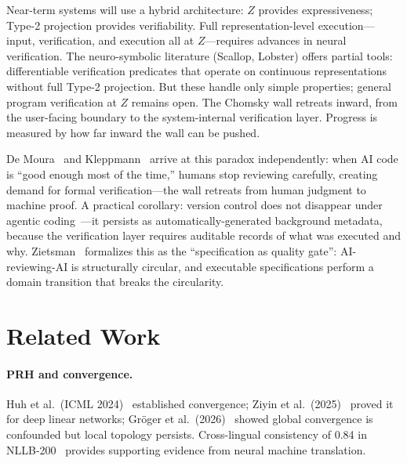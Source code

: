 \documentclass[11pt]{article}
\theoremstyle{definition}
\begin{document}
Near-term systems will use a hybrid architecture: $Z$ provides expressiveness; Type-2 projection provides verifiability. Full representation-level execution---input, verification, and execution all at $Z$---requires advances in neural verification. The neuro-symbolic literature (Scallop, Lobster) offers partial tools: differentiable verification predicates that operate on continuous representations without full Type-2 projection. But these handle only simple properties; general program verification at $Z$ remains open. The Chomsky wall retreats inward, from the user-facing boundary to the system-internal verification layer. Progress is measured by how far inward the wall can be pushed.

De Moura~\cite{demoura2026verify} and Kleppmann~\cite{kleppmann2025formalverify} arrive at this paradox independently: when AI code is ``good enough most of the time,'' humans stop reviewing carefully, creating demand for formal verification---the wall retreats from human judgment to machine proof. A practical corollary: version control does not disappear under agentic coding~\cite{pinera2026rethinking}---it persists as automatically-generated background metadata, because the verification layer requires auditable records of what was executed and why. Zietsman~\cite{zietsman2026specgate} formalizes this as the ``specification as quality gate'': AI-reviewing-AI is structurally circular, and executable specifications perform a domain transition that breaks the circularity.



\section{Related Work}\label{sec:related}

\paragraph{PRH and convergence.}
Huh et al.\ (ICML 2024)~\cite{huh2024platonic} established convergence; Ziyin et al.\ (2025)~\cite{ziyin2025proof} proved it for deep linear networks; Gr\"{o}ger et al.\ (2026)~\cite{groger2026aristotelian} showed global convergence is confounded but local topology persists. Cross-lingual consistency of 0.84 in NLLB-200~\cite{chen2026universalconcept} provides supporting evidence from neural machine translation.
\end{document}
